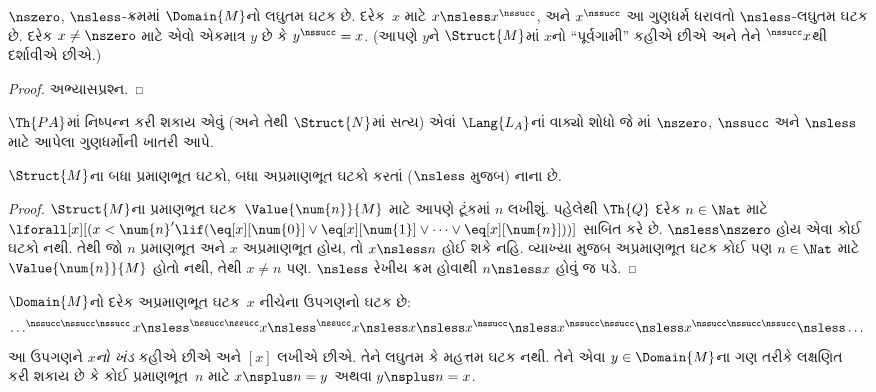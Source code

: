 \begin{prop}
 $\nszero$, $\nsless$-ક્રમમાં
$\Domain{M}$નો લઘુતમ ઘટક છે. દરેક~$x$ માટે
$x\nsless x^\nssucc$, અને $x^\nssucc$ આ ગુણધર્મ ધરાવતો
$\nsless$-લઘુતમ ઘટક છે. દરેક $x\neq\nszero$ માટે એવો એકમાત્ર
$y$ છે કે $y^\nssucc=x$. (આપણે $y$ને $\Struct{M}$માં $x$નો
``પૂર્વગામી'' કહીએ છીએ અને તેને $^\nssucc x$થી દર્શાવીએ છીએ.)
\end{prop}

\begin{proof}
અભ્યાસપ્રશ્ન.
\end{proof}

\begin{prob}
$\Th{PA}$માં નિષ્પન્ન કરી શકાય એવું (અને તેથી $\Struct{N}$માં સત્ય) એવાં
$\Lang{L_A}$નાં વાક્યો શોધો જે
માં $\nszero$, $\nssucc$ અને
$\nsless$ માટે આપેલા ગુણધર્મોની ખાતરી આપે.
\end{prob}

\begin{prop}
$\Struct{M}$ના બધા પ્રમાણભૂત ઘટકો, બધા અપ્રમાણભૂત
ઘટકો કરતાં ($\nsless$ મુજબ) નાના છે.
\end{prop}

\begin{proof}
$\Struct{M}$ના પ્રમાણભૂત ઘટક~$\Value{\num{n}}{M}$ માટે આપણે
ટૂંકમાં $n$ લખીશું. પહેલેથી $\Th{Q}$ દરેક $n\in\Nat$ માટે
$\lforall[x][(x<\num{n}'\lif(\eq[x][\num{0}]\lor
\eq[x][\num{1}]\lor\dots\lor\eq[x][\num{n}]))]$ સાબિત કરે છે.
$\nsless\nszero$ હોય એવા કોઈ ઘટકો નથી. તેથી જો $n$
પ્રમાણભૂત અને $x$ અપ્રમાણભૂત હોય, તો $x\nsless n$ હોઈ શકે નહિ.
વ્યાખ્યા મુજબ અપ્રમાણભૂત ઘટક કોઈ પણ $n\in\Nat$ માટે
$\Value{\num{n}}{M}$ હોતો નથી, તેથી $x\neq n$ પણ. $\nsless$ રેખીય
ક્રમ હોવાથી $n\nsless x$ હોવું જ પડે.
\end{proof}

\begin{prop}
$\Domain{M}$નો દરેક અપ્રમાણભૂત ઘટક~$x$ નીચેના ઉપગણનો ઘટક છે:
\[
\dots ^{\nssucc\nssucc\nssucc}x \nsless ^{\nssucc\nssucc}x \nsless
^{\nssucc}x \nsless x \nsless x^{\nssucc} \nsless x^{\nssucc\nssucc}
\nsless x^{\nssucc\nssucc\nssucc} \nsless \dots
\]
આ ઉપગણને \emph{$x$નો ખંડ} કહીએ છીએ અને $[x]$ લખીએ છીએ. તેને લઘુતમ
કે મહત્તમ ઘટક નથી. તેને એવા $y\in\Domain{M}$ના ગણ તરીકે
લક્ષણિત કરી શકાય છે કે કોઈ પ્રમાણભૂત~$n$ માટે
$x\nsplus n=y$ અથવા $y\nsplus n=x$.
\end{prop}

